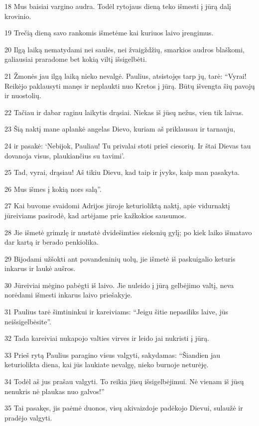 \par 18 Mus baisiai vargino audra. Todėl rytojaus dieną teko išmesti į jūrą dalį krovinio. 
\par 19 Trečią dieną savo rankomis išmetėme kai kuriuos laivo įrengimus. 
\par 20 Ilgą laiką nematydami nei saulės, nei žvaigždžių, smarkios audros blaškomi, galiausiai praradome bet kokią viltį išsigelbėti. 
\par 21 Žmonės jau ilgą laiką nieko nevalgė. Paulius, atsistojęs tarp jų, tarė: “Vyrai! Reikėjo paklausyti manęs ir neplaukti nuo Kretos į jūrą. Būtų išvengta šių pavojų ir nuostolių. 
\par 22 Tačiau ir dabar raginu laikytis drąsiai. Niekas iš jūsų nežus, vien tik laivas. 
\par 23 Šią naktį mane aplankė angelas Dievo, kuriam aš priklausau ir tarnauju, 
\par 24 ir pasakė: ‘Nebijok, Pauliau! Tu privalai stoti prieš ciesorių. Ir štai Dievas tau dovanoja visus, plaukiančius su tavimi’. 
\par 25 Tad, vyrai, drąsiau! Aš tikiu Dievu, kad taip ir įvyks, kaip man pasakyta. 
\par 26 Mus išmes į kokią nors salą”. 
\par 27 Kai buvome svaidomi Adrijos jūroje keturioliktą naktį, apie vidurnaktį jūreiviams pasirodė, kad artėjame prie kažkokios sausumos. 
\par 28 Jie išmetė grimzlę ir nustatė dvidešimties sieksnių gylį; po kiek laiko išmatavo dar kartą ir berado penkiolika. 
\par 29 Bijodami užšokti ant povandeninių uolų, jie išmetė iš paskuigalio keturis inkarus ir laukė aušros. 
\par 30 Jūreiviai mėgino pabėgti iš laivo. Jie nuleido į jūrą gelbėjimo valtį, neva norėdami išmesti inkarus laivo priešakyje. 
\par 31 Paulius tarė šimtininkui ir kareiviams: “Jeigu šitie nepasiliks laive, jūs neišsigelbėsite”. 
\par 32 Tada kareiviai nukapojo valties virves ir leido jai nukristi į jūrą. 
\par 33 Prieš rytą Paulius paragino visus valgyti, sakydamas: “Šiandien jau keturiolikta diena, kai jūs laukiate nevalgę, nieko burnoje neturėję. 
\par 34 Todėl aš jus prašau valgyti. To reikia jūsų išsigelbėjimui. Nė vienam iš jūsų nenukris nė plaukas nuo galvos!” 
\par 35 Tai pasakęs, jis paėmė duonos, visų akivaizdoje padėkojo Dievui, sulaužė ir pradėjo valgyti. 
